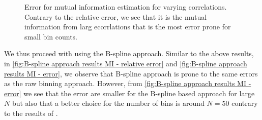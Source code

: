 \documentclass[../Thesis.tex]{subfiles}
\begin{document}
\begin{figure}[H]
\begin{subfigure}[t]{0.4\textwidth}
        \caption{}
    \end{subfigure}
    \caption{Error for mutual information estimation for varying correlations. Contrary to the relative error, we see that it is the mutual information from larg ecorrlations that is the most error prone for small bin counts.}
    \label{fig:raw hsitogram error for MI estimation}
\end{figure}
We thus proceed with using the B-spline approach. Similar to the above results, in \autoref{fig:B-spline approach results MI - relative error} and \autoref{fig:B-spline approach results MI - error}, we observe that B-spline approach is prone to the same errors as the raw binning approach. However, from \autoref{fig:B-spline approach results MI - error} we see that the error are smaller for the B-spline based approach for large $N$ but also that a better choice for the number of bins is around $N = 50$ contrary to the results of \cite{Network-deconvolution-as-a-general-method-to-distinguish-direct-dependencies-in-networks}.
\end{document}
